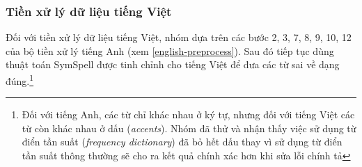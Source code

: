 \subsubsection{Tiền xử lý dữ liệu tiếng Việt}
Đối với tiền xử lý dữ liệu tiếng Việt, nhóm dựa trên các bước 2, 3, 7, 8, 9, 10, 12 của bộ tiền xử lý tiếng Anh (xem \ref{english-preprocess}). Sau đó tiếp tục dùng thuật toán SymSpell được tinh chỉnh cho tiếng Việt để đưa các từ sai về dạng đúng.\footnote{Đối với tiếng Anh, các từ chỉ khác nhau ở ký tự, nhưng đối với tiếng Việt các từ còn khác nhau ở dấu (\textit{accents}). Nhóm đã thử và nhận thấy việc sử dụng từ điển tần suất (\textit{frequency dictionary}) đã bỏ hết dấu thay vì sử dụng từ điển tần suất thông thường sẽ cho ra kết quả chính xác hơn khi sửa lỗi chính tả}
